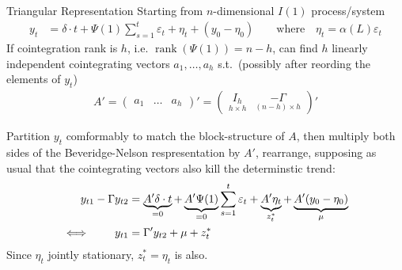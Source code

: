 \documentclass[aspectratio=169, handout]{beamer}
\newcommand{\rank}{\operatorname{rank}}
\begin{document}
{\footnotesize
\begin{frame}{Triangular Representation}
Starting from $n$-dimensional $I(1)$ process/system
\begin{align*}
  y_t
  &=
  \delta \cdot t
  +
  \Psi(1)
  \sum_{s=1}^t
  \varepsilon_t
  +
  \eta_t
  +
  (y_0-\eta_0)
  \qquad\text{where}\quad
  \eta_t
  =
  \alpha(L)\varepsilon_t
\end{align*}
If cointegration rank is $h$, i.e. $\rank(\Psi(1))=n-h$,
can find $h$ linearly independent cointegrating
vectors $a_1,\ldots,a_h$ s.t.\
(possibly after reording the elements of $y_t$)
\begin{align*}
  A' =
  \begin{pmatrix}
    a_1& \ldots & a_h
  \end{pmatrix}'
  =
  \begin{pmatrix}
    \underset{h\times h}{I_h} &
    \underset{(n-h)\times h}{-\Gamma}
  \end{pmatrix}'
\end{align*}

Partition $y_t$ comformably to match the block-structure of $A$, then
multiply both sides of the Beveridge-Nelson respresentation by $A'$,
rearrange, supposing as usual that the cointegrating vectors also kill
the determinstic trend:
\begin{align*}
  y_{t1}
  - \Gamma y_{t2}
  &=
  \underbrace{%
    A'\delta \cdot t
  }_{=0}
  +
  \underbrace{%
    A'\Psi(1)
  }_{=0}
  \sum_{s=1}^t
  \varepsilon_t
  +
  \underbrace{%
    A'\eta_t
  }_{z_t^*}
  +
  \underbrace{%
    A'(y_0-\eta_0)
  }_{\mu}
  \\
  \iff\qquad
  y_{t1}
  &=
  \Gamma' y_{t2}
  +
  \mu
  +
  z_t^*
\end{align*}
Since $\eta_t$ jointly stationary, $z_t^*=\eta_t$ is also.
\end{frame}
}
\end{document}
